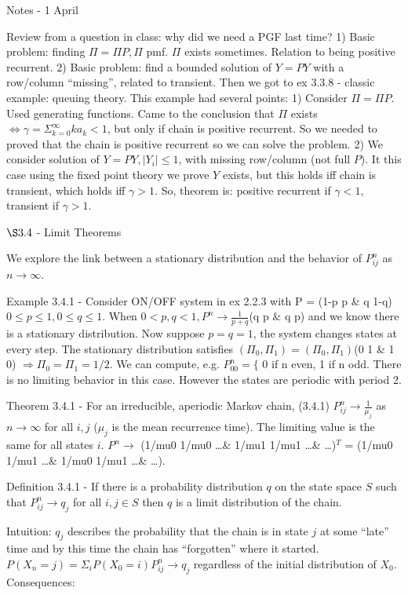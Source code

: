 \documentclass{article}
\begin{document}
Notes - 1 April

Review from a question in class: why did we need a PGF last time? 1) Basic problem: finding $\Pi = \Pi P, \Pi$ pmf. $\Pi$ exists sometimes. Relation to being positive recurrent.  2) Basic problem: find a bounded solution of $Y = PY$ with a row/column ``missing'', related to transient. Then we got to ex 3.3.8 - classic example: queuing theory. This example had several points: 1) Consider $\Pi = \Pi P$. Used generating functions. Came to the conclusion that $\Pi$ exists $\iff \gamma = \Sigma_{k=0}^\infty k a_k < 1$, but only if chain is positive recurrent. So we needed to proved that the chain is positive recurrent so we can solve the problem. 2) We consider solution of $Y = PY, |Y_i| \le 1$, with missing row/column (not full $P$). It this case using the fixed point theory we prove $Y$ exists, but this holds iff chain is transient, which holds iff $\gamma > 1$. So, theorem is: positive recurrent if $\gamma < 1$, transient if $\gamma > 1$.

$\S 3.4$ - Limit Theorems

We explore the link between a stationary distribution and the behavior of $P_{ij}^n$ as $n \rightarrow \infty$.

Example 3.4.1 - Consider ON/OFF system in ex 2.2.3 with P = (1-p p \& q 1-q) $0 \le p \le 1, 0 \le q \le 1$. When $0 < p, q < 1, P^n \rightarrow \frac{1}{p+q}$(q p \& q p) and we know there is a stationary distribution. Now suppose $p = q = 1$, the system changes states at every step. The stationary distribution satisfies $(\Pi_0, \Pi_1) = (\Pi_0, \Pi_1)$(0 1 \& 1 0) $\Rightarrow \Pi_0 = \Pi_1 = 1/2$. We can compute, e.g. $P_{00}^n = \{$ 0 if n even, 1 if n odd. There is no limiting behavior in this case. However the states are periodic with period 2.

Theorem 3.4.1 - For an irreducible, aperiodic Markov chain, (3.4.1) $P_{ij}^n \rightarrow \frac{1}{\mu_j}$ as $n \rightarrow \infty$ for all $i, j$ ($\mu_j$ is the mean recurrence time). The limiting value is the same for all states $i$. $P^n \rightarrow$ (1/mu0 1/mu0 \dots \& 1/mu1 1/mu1 \dots \& \dots)$^T$ = (1/mu0 1/mu1 \dots \& 1/mu0 1/mu1 \dots \& \dots).

Definition 3.4.1 - If there is a probability distribution $q$ on the state space $S$ such that $P_{ij}^n \rightarrow q_j$ for all $i, j \in S$ then $q$ is a limit distribution of the chain.

Intuition: $q_j$ describes the probability that the chain is in state $j$ at some ``late'' time and by this time the chain has ``forgotten'' where it started. $P(X_n=j) = \Sigma_i P(X_0=i) P_{ij}^n \rightarrow q_j$ regardless of the initial distribution of $X_0$. Consequences:
\end{document}
